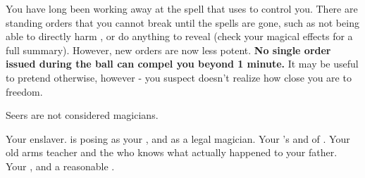 \documentclass[char]{NeptuneBall}
\begin{document}
\begin{itemz}[Note]
  \item You have long been working away at the spell that \cWitch{} uses to control you. There are standing orders that you cannot break until the spells are gone, such as not being able to directly harm \cWitch{\them}, or do anything to reveal \cWitch{\them} (check your magical effects for a full summary). However, new orders are now less potent. {\bf No single order issued during the ball can compel you beyond 1 minute.} It may be useful to pretend otherwise, however - you suspect \cWitch{} doesn't realize how close you are to freedom.
  \item Seers are not considered magicians.
\end{itemz}

\begin{contacts}
  \contact{\cWitch{}} Your enslaver. \cWitch{\They} is posing as your \cWitch{\sibling}, and as a legal magician.
  \contact{\cAriel{}} Your \cEric{\sibling}'s \cAriel{\spouse} and \cAriel{\King} of \pAmerica{}.
  \contact{\cGeneral{}} Your old arms teacher and the \cGeneral{\mer} who knows what actually happened to your father.
  \contact{\cKing{}} Your \cKing{\King}, and a reasonable \cKing{\mer}.
\end{contacts}
\end{document}
